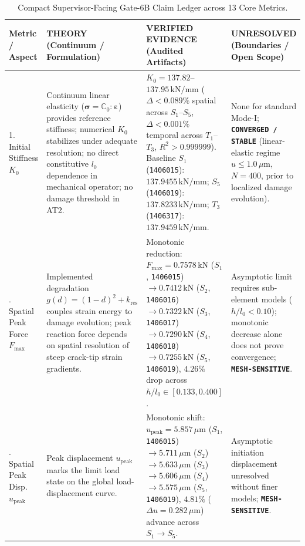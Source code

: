 \begin{table}[htbp]
\centering
\caption{Compact Supervisor-Facing Gate-6B Claim Ledger across 13 Core Metrics.}
\label{tab:claim_ledger}
\tiny
\setlength{\tabcolsep}{2pt}
\begin{tabularx}{\textwidth}{p{2.2cm}p{3.8cm}p{4.2cm}X}
\toprule
Metric / Aspect & \textbf{THEORY} (Continuum / Formulation) & \textbf{VERIFIED EVIDENCE} (Audited Artifacts) & \textbf{UNRESOLVED} (Boundaries / Open Scope) \\
\midrule
1. Initial Stiffness $K_0$ & Continuum linear elasticity ($\boldsymbol{\sigma} = \mathbb{C}_0 : \boldsymbol{\varepsilon}$) provides reference stiffness; numerical $K_0$ stabilizes under adequate resolution; no direct constitutive $l_0$ dependence in mechanical operator; no damage threshold in AT2. & $K_0 = 137.82$--$137.95\,\mathrm{kN/mm}$ ($\Delta < 0.089\%$ spatial across $S_1$--$S_5$, $\Delta < 0.001\%$ temporal across $T_1$--$T_3$, $R^2 > 0.999999$). Baseline $S_1$ (\texttt{1406015}): $137.9455\,\mathrm{kN/mm}$; $S_5$ (\texttt{1406019}): $137.8233\,\mathrm{kN/mm}$; $T_3$ (\texttt{1406317}): $137.9459\,\mathrm{kN/mm}$. & None for standard Mode-I; \textbf{\texttt{CONVERGED / STABLE}} (linear-elastic regime $u \le 1.0\,\mu\mathrm{m}$, $N=400$, prior to localized damage evolution). \\
\addlinespace
2. Spatial Peak Force $F_{\max}$ & Implemented degradation $g(d) = (1-d)^2 + k_{\mathrm{res}}$ couples strain energy to damage evolution; peak reaction force depends on spatial resolution of steep crack-tip strain gradients. & Monotonic reduction: $F_{\max} = 0.7578\,\mathrm{kN}$ ($S_1$, \texttt{1406015}) $\to 0.7412\,\mathrm{kN}$ ($S_2$, \texttt{1406016}) $\to 0.7322\,\mathrm{kN}$ ($S_3$, \texttt{1406017}) $\to 0.7290\,\mathrm{kN}$ ($S_4$, \texttt{1406018}) $\to 0.7255\,\mathrm{kN}$ ($S_5$, \texttt{1406019}), $4.26\%$ drop across $h/l_0 \in [0.133, 0.400]$. & Asymptotic limit requires sub-element models ($h/l_0 < 0.10$); monotonic decrease alone does not prove convergence; \textbf{\texttt{MESH-SENSITIVE}}. \\
\addlinespace
3. Spatial Peak Disp. $u_{\mathrm{peak}}$ & Peak displacement $u_{\mathrm{peak}}$ marks the limit load state on the global load-displacement curve. & Monotonic shift: $u_{\mathrm{peak}} = 5.857\,\mu\mathrm{m}$ ($S_1$, \texttt{1406015}) $\to 5.711\,\mu\mathrm{m}$ ($S_2$) $\to 5.633\,\mu\mathrm{m}$ ($S_3$) $\to 5.606\,\mu\mathrm{m}$ ($S_4$) $\to 5.575\,\mu\mathrm{m}$ ($S_5$, \texttt{1406019}), $4.81\%$ ($\Delta u = 0.282\,\mu\mathrm{m}$) advance across $S_1 \to S_5$. & Asymptotic initiation displacement unresolved without finer models; \textbf{\texttt{MESH-SENSITIVE}}. \\

\end{tabularx}
\end{table}

